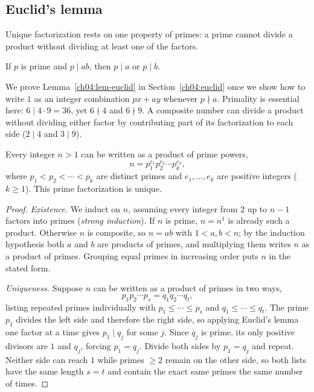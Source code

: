 \subsection*{Euclid's lemma}

Unique factorization rests on one property of primes: a prime cannot divide a product without
dividing at least one of the factors.

\begin{lemma}
\label{ch04:lem-euclid}
If $p$ is prime and $p \mid ab$, then $p \mid a$ or $p \mid b$.
\end{lemma}

We prove Lemma~\ref{ch04:lem-euclid} in Section~\ref{ch04:euclid} once we show how to write $1$ as
an integer combination $px + ay$ whenever $p \nmid a$. Primality is essential here:
$6 \mid 4 \cdot 9 = 36$, yet $6 \nmid 4$ and $6 \nmid 9$. A composite number can divide a product
without dividing either factor by contributing part of its factorization to each side ($2 \mid 4$
and $3 \mid 9$).

\begin{theorem}
\label{ch04:thm-fta}
Every integer $n > 1$ can be written as a product of prime powers,
\[
  n = p_1^{e_1} p_2^{e_2} \cdots p_k^{e_k},
\]
where $p_1 < p_2 < \cdots < p_k$ are distinct primes and $e_1, \dots, e_k$ are positive integers
($k \ge 1$). This prime factorization is unique.
\end{theorem}

\begin{proof}
\emph{Existence.} We induct on $n$, assuming every integer from $2$ up to $n - 1$ factors into
primes (\emph{strong induction}). If $n$ is prime, $n = n^1$ is already such a product. Otherwise
$n$ is composite, so $n = ab$ with $1 < a, b < n$; by the induction hypothesis both $a$ and $b$ are
products of primes, and multiplying them writes $n$ as a product of primes. Grouping equal primes
in increasing order puts $n$ in the stated form.

\emph{Uniqueness.} Suppose $n$ can be written as a product of primes in two ways,
\[
  p_1 p_2 \cdots p_s = q_1 q_2 \cdots q_t,
\]
listing repeated primes individually with $p_1 \le \cdots \le p_s$ and $q_1 \le \cdots \le q_t$. The
prime $p_1$ divides the left side and therefore the right side, so applying Euclid's lemma one
factor at a time gives $p_1 \mid q_j$ for some $j$. Since $q_j$ is prime, its only positive divisors
are $1$ and $q_j$, forcing $p_1 = q_j$. Divide both sides by $p_1 = q_j$ and repeat. Neither side
can reach $1$ while primes $\ge 2$ remain on the other side, so both lists have the same length
$s = t$ and contain the exact same primes the same number of times.
\end{proof}

